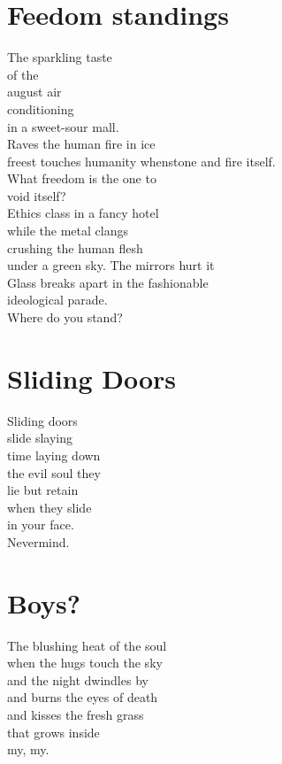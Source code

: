 \documentclass[a4paper,twoside, openany]{book}
\newenvironment{Verse}
  {\center\varwidth{\linewidth}\fontsize{18}{21.6}\selectfont}
  {\endvarwidth\endcenter}
\begin{document}
\chapter{Feedom standings}
\begin{Verse}
The sparkling taste\\
of the\\
august air\\
conditioning\\
in a sweet-sour mall.\\
Raves the human fire in ice\\
 freest touches humanity whenstone and fire itself.\\
What freedom is the one to \\
void itself?\\
Ethics class in a fancy hotel\\
while the metal clangs\\
crushing the human flesh \\
under a green sky.
The mirrors hurt it\\
Glass breaks apart in the fashionable\\
ideological parade.\\
Where do you stand?
\end{Verse}
\chapter{Sliding Doors}
\begin{Verse}
Sliding doors\\
slide slaying\\
time laying down\\
the evil soul they\\
lie but retain\\
when they slide\\
in your face.\\
Nevermind.
\end{Verse}
\chapter{Boys?}
\begin{Verse}
The blushing heat of the soul\\
when the hugs touch the sky\\
and the night dwindles by\\
and burns the eyes of death\\
and kisses the fresh grass\\
that grows inside\\
my, my.
\end{Verse}
\newpage\null\thispagestyle{empty}\newpage
\end{document}

